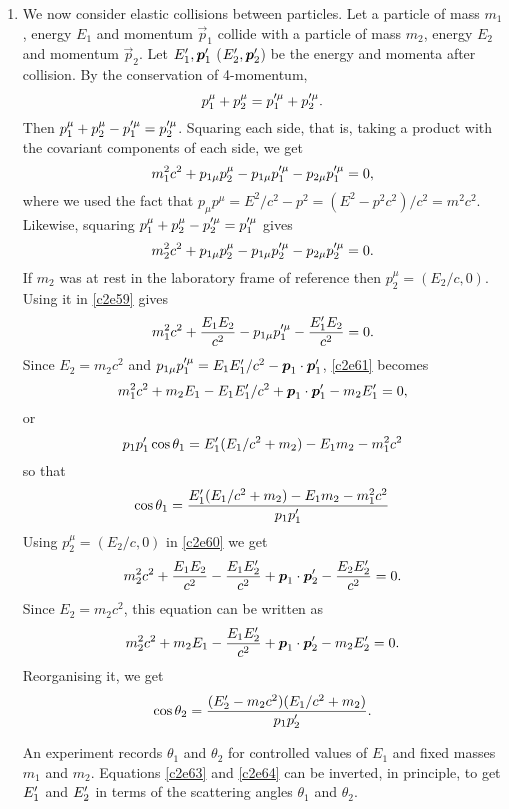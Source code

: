 \begin{enumerate}
\item We now consider elastic collisions between particles. Let a particle of
mass $m_1$, energy $E_1$ and momentum $\vec{p}_1$ collide with a particle of mass
$m_2$, energy $E_2$ and momentum $\vec{p}_2$. Let $E_1^\prime, \boldsymbol{p}_1^\prime$ ($E_2^\prime,
\boldsymbol{p}_2^\prime$) be the energy and momenta after collision. By the conservation of 
4-momentum,
\begin{equation}\label{c2e58}
p_1^\mu + p_2^\mu = p_1^{\prime\mu} + p_2^{\prime\mu}.
\end{equation}
Then $p_1^\mu + p_2^\mu - p_1^{\prime\mu} = p_2^{\prime\mu}$. Squaring each side, that
is, taking a product with the covariant components of each side, we get
\begin{equation}\label{c2e59}
m_1^2c^2 + p_{1\mu}p_2^\mu - p_{1\mu}p_1^{\prime\mu} - p_{2\mu}p_1^{\prime\mu} = 0,
\end{equation}
where we used the fact that $p_\mu p^\mu = E^2/c^2 - p^2 = (E^2 - p^2c^2)/c^2 =
m^2c^2$.
Likewise, squaring $p_1^\mu + p_2^\mu - p_2^{\prime\mu} = p_1^{\prime\mu}$ gives
\begin{equation}\label{c2e60}
m_2^2c^2 + p_{1\mu}p_2^\mu - p_{1\mu}p_2^{\prime\mu} - p_{2\mu}p_2^{\prime\mu} = 0.
\end{equation}
If $m_2$ was at rest in the laboratory frame of reference then $p_2^\mu = (E_2/c,
0)$. Using it in \eqref{c2e59} gives
\begin{equation}\label{c2e61}
m_1^2c^2 + \frac{E_1E_2}{c^2} - p_{1\mu}p_1^{\prime\mu} - \frac{E_1^\prime E_2}{c^2} = 0.
\end{equation}
Since $E_2 = m_2c^2$ and $p_{1\mu}p_1^{\prime\mu} = E_1E_1^\prime/c^2 - \boldsymbol{p}_1\cdot
\boldsymbol{p}_1^\prime$, \eqref{c2e61} becomes
\begin{equation}\label{c2e62}
m_1^2c^2 + m_2E_1 - E_1E_1^\prime/c^2 + \boldsymbol{p}_1\cdot\boldsymbol{p}_1^\prime - m_2E_1^\prime = 0,
\end{equation}
or
\[
p_1p_1^\prime\cos\theta_1 = E_1^\prime(E_1/c^2 + m_2) - E_1m_2 - m_1^2c^2
\]
so that
\begin{equation}\label{c2e63}
\cos\theta_1 = \frac{E_1^\prime(E_1/c^2 + m_2) - E_1m_2 - m_1^2c^2}{p_1p_1^\prime}
\end{equation}
Using $p_2^\mu = (E_2/c, 0)$ in \eqref{c2e60} we get
\[
m_2^2c^2 + \frac{E_1E_2}{c^2} - \frac{E_1E_2^\prime}{c^2} + 
\boldsymbol{p}_1\cdot\boldsymbol{p}_2^\prime - \frac{E_2E_2^\prime}{c^2} = 0.
\]
Since $E_2 = m_2c^2$, this equation can be written as
\[
m_2^2c^2 + m_2E_1 - \frac{E_1E_2^\prime}{c^2} + 
\boldsymbol{p}_1\cdot\boldsymbol{p}_2^\prime - m_2E_2^\prime = 0.
\]
Reorganising it, we get
\begin{equation}\label{c2e64}
\cos\theta_2 = \frac{(E_2^\prime - m_2c^2)(E_1/c^2 + m_2)}{p_1p_2^\prime}.
\end{equation}

An experiment records $\theta_1$ and $\theta_2$ for controlled values of $E_1$
and fixed masses $m_1$ and $m_2$. Equations \eqref{c2e63} and \eqref{c2e64}
can be inverted, in principle, to get $E_1^\prime$ and $E_2^\prime$ in terms of
the scattering angles $\theta_1$ and $\theta_2$.

\end{enumerate}